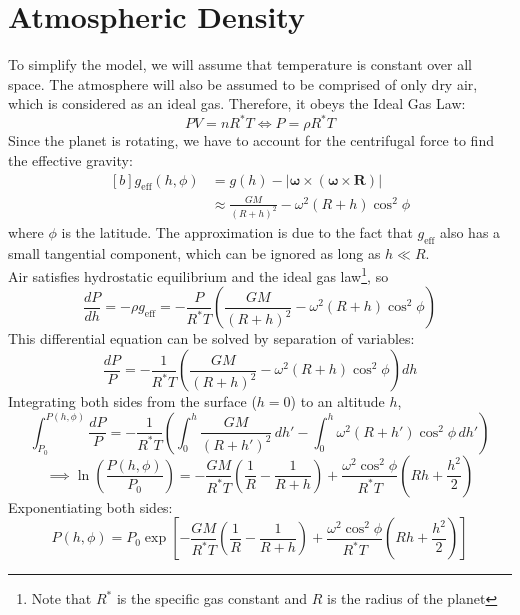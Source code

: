 \documentclass[14]{article}
\newcommand{\bs}[1]{\boldsymbol{#1}}
\newcommand{\om}{\omega}
\begin{document}
\section{Atmospheric Density}
To simplify the model, we will assume that temperature is constant over all space. The atmosphere will also be assumed to be comprised of only dry air, which is considered as an ideal gas. Therefore, it obeys the Ideal Gas Law:
\begin{equation}
PV=nR^*T \iff P=\rho R^*T
\end{equation}
Since the planet is rotating, we have to account for the centrifugal force to find the effective gravity:
\begin{equation}
\begin{aligned}[b]
g_{\text{eff}}(h, \phi) &= g(h) - |\bs{\om} \times (\bs{\om} \times \bs{R})|\\
&\approx \frac{GM}{(R+h)^2} - \omega^2(R+h)\cos^2\phi
\end{aligned}
\end{equation}
where $\phi$ is the latitude. The approximation is due to the fact that $g_{\text{eff}}$ also has a small tangential component, which can be ignored as long as $h \ll R$.\\
Air satisfies hydrostatic equilibrium and the ideal gas law\footnote{Note that $R^*$ is the specific gas constant and $R$ is the radius of the planet}, so
\begin{equation}
\frac{dP}{dh} = -\rho g_{\text{eff}} = -\frac{P}{R^*T}\left(\frac{GM}{(R+h)^2} - \omega^2(R+h)\cos^2\phi\right)
\end{equation}
This differential equation can be solved by separation of variables:
\begin{equation*}
\frac{dP}{P} = -\frac{1}{R^*T}\left(\frac{GM}{(R+h)^2} - \omega^2(R+h)\cos^2\phi\right) dh
\end{equation*}
Integrating both sides from the surface ($h = 0$) to an altitude $h$,
\begin{equation*}
\int_{P_0}^{P(h, \phi)} \frac{dP}{P} = -\frac{1}{R^*T} \left(\int_0^h \frac{GM}{(R+h')^2} \, dh' - \int_0^h \omega^2 (R+h')\cos^2\phi \, dh'\right)
\end{equation*}
\begin{equation*}
\implies \ln\left(\frac{P(h, \phi)}{P_0}\right) = -\frac{GM}{R^*T} \left(\frac{1}{R} - \frac{1}{R+h}\right) + \frac{\omega^2 \cos^2\phi}{R^*T} \left(Rh + \frac{h^2}{2}\right)
\end{equation*}
Exponentiating both sides:
\begin{equation}
P(h, \phi) = P_0 \exp\left[-\frac{GM}{R^*T} \left(\frac{1}{R} - \frac{1}{R+h}\right) + \frac{\omega^2 \cos^2\phi}{R^*T} \left(Rh + \frac{h^2}{2}\right)\right]
\end{equation}
\end{document}
